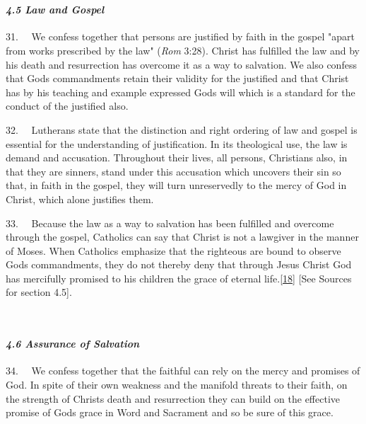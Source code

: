 ~

\paragraph{\texorpdfstring{\emph{4.5 Law and
Gospel}}{4.5 Law and Gospel}}\label{law-and-gospel}

31.~ ~We confess together that persons are justified by faith in the
gospel "apart from works prescribed by the law" (\emph{Rom} 3:28).
Christ has fulfilled the law and by his death and resurrection has
overcome it as a way to salvation. We also confess that
God\textquotesingle s commandments retain their validity for the
justified and that Christ has by his teaching and example expressed
God\textquotesingle s will which is a standard for the conduct of the
justified also.

32.~ ~Lutherans state that the distinction and right ordering of law and
gospel is essential for the understanding of justification. In its
theological use, the law is demand and accusation. Throughout their
lives, all persons, Christians also, in that they are sinners, stand
under this accusation which uncovers their sin so that, in faith in the
gospel, they will turn unreservedly to the mercy of God in Christ, which
alone justifies them.

33.~ ~Because the law as a way to salvation has been fulfilled and
overcome through the gospel, Catholics can say that Christ is not a
lawgiver in the manner of Moses. When Catholics emphasize that the
righteous are bound to observe God\textquotesingle s commandments, they
do not thereby deny that through Jesus Christ God has mercifully
promised to his children the grace of eternal
life.\label{r18}{}\hyperref[18]{{[}18{]}} {[}See Sources
for section 4.5{]}.

~

\paragraph{\texorpdfstring{\emph{4.6 Assurance of
Salvation}}{4.6 Assurance of Salvation}}\label{assurance-of-salvation}

34.~ ~We confess together that the faithful can rely on the mercy and
promises of God. In spite of their own weakness and the manifold threats
to their faith, on the strength of Christ\textquotesingle s death and
resurrection they can build on the effective promise of
God\textquotesingle s grace in Word and Sacrament and so be sure of this
grace.

